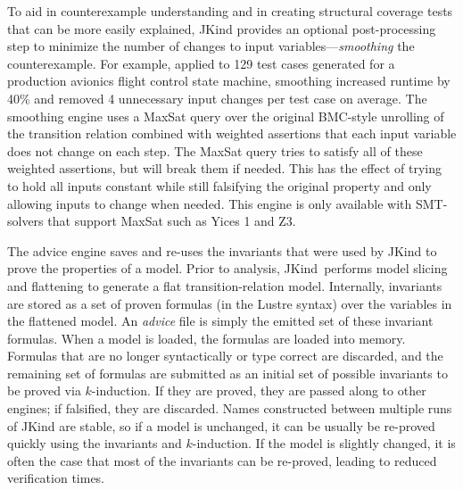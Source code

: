 \documentclass{llncs}
\newcommand{\jkind}{{\sc JKind}\xspace}
\newcommand{\lustre}{{\sc Lustre}\xspace}
\newcommand{\yices}{{\sc Yices}\xspace}
\newcommand{\zthree}{{\sc Z3}\xspace}
\renewcommand{\paragraph}[1]{\vspace{5pt}\noindent {\bf #1}}
\begin{document}

\paragraph{Smoothing.}  To aid in counterexample understanding and in
creating structural coverage tests that can be more easily explained,
\jkind provides an optional post-processing step to minimize the
number of changes to input variables---{\em smoothing} the
counterexample.  For example, applied to 129 test cases generated for
a production avionics flight control state machine, smoothing
increased runtime by 40\% and removed 4 unnecessary input changes per
test case on average.  The smoothing engine uses a {\sc MaxSat} query
over the original BMC-style unrolling of the transition relation
combined with weighted assertions that each input variable does not
change on each step. The {\sc MaxSat} query tries to satisfy all of
these weighted assertions, but will break them if needed. This has the
effect of trying to hold all inputs constant while still falsifying
the original property and only allowing inputs to change when
needed. This engine is only available with SMT-solvers that support
{\sc MaxSat} such as \yices 1 and \zthree.

\paragraph{Advice.} The advice engine saves and re-uses the invariants that were used by \jkind to prove the properties of a model.  Prior to analysis, \jkind\ performs model slicing and flattening to generate a flat transition-relation model.  Internally, invariants are stored as a set of proven formulas (in the \lustre syntax) over the variables in the flattened model.  An {\em advice} file is simply the emitted set of these invariant formulas.  When a model is loaded, the formulas are loaded into memory. Formulas that are no longer syntactically or type correct are discarded, and the remaining set of formulas are submitted as an initial set of possible invariants to be proved via $k$-induction. If they are proved, they are passed along to other engines; if falsified, they are discarded.
%
Names constructed between multiple runs of \jkind are stable, so if a
model is unchanged, it can be usually be re-proved quickly using the
invariants and $k$-induction.  If the model is slightly changed, it is
often the case that most of the invariants can be re-proved, leading
to reduced verification times.
\end{document}
